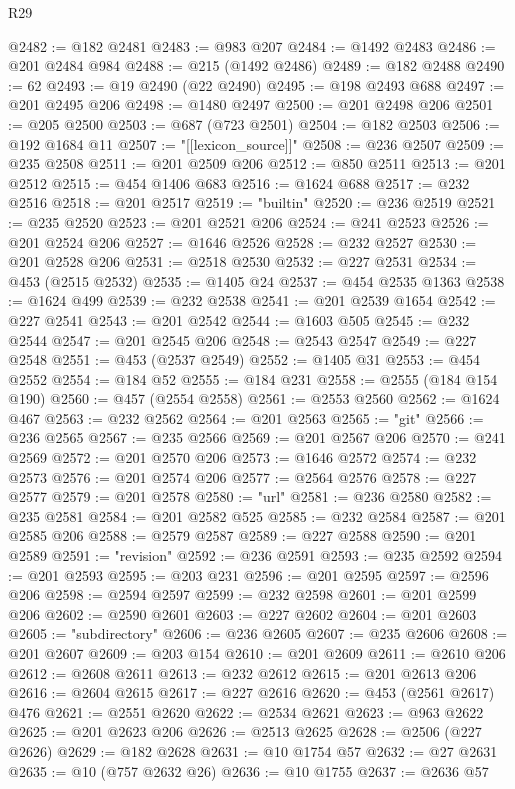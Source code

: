 \begin{lexlean}{R29}
\begin{coremodule}
@2482 := @182 @2481
@2483 := @983 @207
@2484 := @1492 @2483
@2486 := @201 @2484 @984
@2488 := @215 (@1492 @2486)
@2489 := @182 @2488
@2490 := 62
@2493 := @19 @2490 (@22 @2490)
@2495 := @198 @2493 @688
@2497 := @201 @2495 @206
@2498 := @1480 @2497
@2500 := @201 @2498 @206
@2501 := @205 @2500
@2503 := @687 (@723 @2501)
@2504 := @182 @2503
@2506 := @192 @1684 @11
@2507 := "[[lexicon_source]]"
@2508 := @236 @2507
@2509 := @235 @2508
@2511 := @201 @2509 @206
@2512 := @850 @2511
@2513 := @201 @2512
@2515 := @454 @1406 @683
@2516 := @1624 @688
@2517 := @232 @2516
@2518 := @201 @2517
@2519 := "builtin"
@2520 := @236 @2519
@2521 := @235 @2520
@2523 := @201 @2521 @206
@2524 := @241 @2523
@2526 := @201 @2524 @206
@2527 := @1646 @2526
@2528 := @232 @2527
@2530 := @201 @2528 @206
@2531 := @2518 @2530
@2532 := @227 @2531
@2534 := @453 (@2515 @2532)
@2535 := @1405 @24
@2537 := @454 @2535 @1363
@2538 := @1624 @499
@2539 := @232 @2538
@2541 := @201 @2539 @1654
@2542 := @227 @2541
@2543 := @201 @2542
@2544 := @1603 @505
@2545 := @232 @2544
@2547 := @201 @2545 @206
@2548 := @2543 @2547
@2549 := @227 @2548
@2551 := @453 (@2537 @2549)
@2552 := @1405 @31
@2553 := @454 @2552
@2554 := @184 @52
@2555 := @184 @231
@2558 := @2555 (@184 @154 @190)
@2560 := @457 (@2554 @2558)
@2561 := @2553 @2560
@2562 := @1624 @467
@2563 := @232 @2562
@2564 := @201 @2563
@2565 := "git"
@2566 := @236 @2565
@2567 := @235 @2566
@2569 := @201 @2567 @206
@2570 := @241 @2569
@2572 := @201 @2570 @206
@2573 := @1646 @2572
@2574 := @232 @2573
@2576 := @201 @2574 @206
@2577 := @2564 @2576
@2578 := @227 @2577
@2579 := @201 @2578
@2580 := "url"
@2581 := @236 @2580
@2582 := @235 @2581
@2584 := @201 @2582 @525
@2585 := @232 @2584
@2587 := @201 @2585 @206
@2588 := @2579 @2587
@2589 := @227 @2588
@2590 := @201 @2589
@2591 := "revision"
@2592 := @236 @2591
@2593 := @235 @2592
@2594 := @201 @2593
@2595 := @203 @231
@2596 := @201 @2595
@2597 := @2596 @206
@2598 := @2594 @2597
@2599 := @232 @2598
@2601 := @201 @2599 @206
@2602 := @2590 @2601
@2603 := @227 @2602
@2604 := @201 @2603
@2605 := "subdirectory"
@2606 := @236 @2605
@2607 := @235 @2606
@2608 := @201 @2607
@2609 := @203 @154
@2610 := @201 @2609
@2611 := @2610 @206
@2612 := @2608 @2611
@2613 := @232 @2612
@2615 := @201 @2613 @206
@2616 := @2604 @2615
@2617 := @227 @2616
@2620 := @453 (@2561 @2617) @476
@2621 := @2551 @2620
@2622 := @2534 @2621
@2623 := @963 @2622
@2625 := @201 @2623 @206
@2626 := @2513 @2625
@2628 := @2506 (@227 @2626)
@2629 := @182 @2628
@2631 := @10 @1754 @57
@2632 := @27 @2631
@2635 := @10 (@757 @2632 @26)
@2636 := @10 @1755
@2637 := @2636 @57

\end{coremodule}
\end{lexlean}
